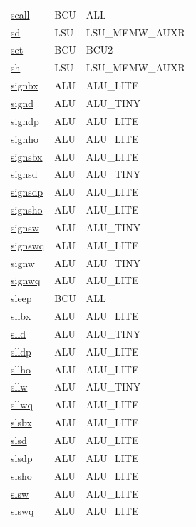 \begin{small}
\begin{longtable}[l]{l l l}
\hyperlink{lvx.scall}{scall} & BCU & ALL \\ 
\hyperlink{lvx.sd}{sd} & LSU & LSU\_MEMW\_AUXR \\ 
\hyperlink{lvx.set}{set} & BCU & BCU2 \\ 
\hyperlink{lvx.sh}{sh} & LSU & LSU\_MEMW\_AUXR \\ 
\hyperlink{lvx.signbx}{signbx} & ALU & ALU\_LITE \\ 
\hyperlink{lvx.signd}{signd} & ALU & ALU\_TINY \\ 
\hyperlink{lvx.signdp}{signdp} & ALU & ALU\_LITE \\ 
\hyperlink{lvx.signho}{signho} & ALU & ALU\_LITE \\ 
\hyperlink{lvx.signsbx}{signsbx} & ALU & ALU\_LITE \\ 
\hyperlink{lvx.signsd}{signsd} & ALU & ALU\_TINY \\ 
\hyperlink{lvx.signsdp}{signsdp} & ALU & ALU\_LITE \\ 
\hyperlink{lvx.signsho}{signsho} & ALU & ALU\_LITE \\ 
\hyperlink{lvx.signsw}{signsw} & ALU & ALU\_TINY \\ 
\hyperlink{lvx.signswq}{signswq} & ALU & ALU\_LITE \\ 
\hyperlink{lvx.signw}{signw} & ALU & ALU\_TINY \\ 
\hyperlink{lvx.signwq}{signwq} & ALU & ALU\_LITE \\ 
\hyperlink{lvx.sleep}{sleep} & BCU & ALL \\ 
\hyperlink{lvx.sllbx}{sllbx} & ALU & ALU\_LITE \\ 
\hyperlink{lvx.slld}{slld} & ALU & ALU\_TINY \\ 
\hyperlink{lvx.slldp}{slldp} & ALU & ALU\_LITE \\ 
\hyperlink{lvx.sllho}{sllho} & ALU & ALU\_LITE \\ 
\hyperlink{lvx.sllw}{sllw} & ALU & ALU\_TINY \\ 
\hyperlink{lvx.sllwq}{sllwq} & ALU & ALU\_LITE \\ 
\hyperlink{lvx.slsbx}{slsbx} & ALU & ALU\_LITE \\ 
\hyperlink{lvx.slsd}{slsd} & ALU & ALU\_LITE \\ 
\hyperlink{lvx.slsdp}{slsdp} & ALU & ALU\_LITE \\ 
\hyperlink{lvx.slsho}{slsho} & ALU & ALU\_LITE \\ 
\hyperlink{lvx.slsw}{slsw} & ALU & ALU\_LITE \\ 
\hyperlink{lvx.slswq}{slswq} & ALU & ALU\_LITE \\ 

\end{longtable}
\end{small}
